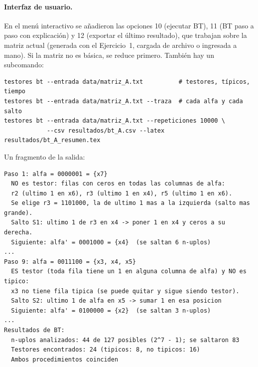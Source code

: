 \documentclass[11pt, a4paper]{article}
\theoremstyle{definition}
\theoremstyle{plain}
\begin{document}
\paragraph{Interfaz de usuario.} En el menú interactivo se añadieron las opciones
10 (ejecutar BT), 11 (BT paso a paso con explicación) y 12 (exportar el último
resultado), que trabajan sobre la matriz actual (generada con el Ejercicio~1,
cargada de archivo o ingresada a mano). Si la matriz no es básica, se reduce
primero. También hay un subcomando:
\begin{Verbatim}[fontsize=\small, frame=single]
testores bt --entrada data/matriz_A.txt          # testores, típicos, tiempo
testores bt --entrada data/matriz_A.txt --traza  # cada alfa y cada salto
testores bt --entrada data/matriz_A.txt --repeticiones 10000 \
            --csv resultados/bt_A.csv --latex resultados/bt_A_resumen.tex
\end{Verbatim}
Un fragmento de la salida:
\begin{Verbatim}[fontsize=\small, frame=single]
Paso 1: alfa = 0000001 = {x7}
  NO es testor: filas con ceros en todas las columnas de alfa:
  r2 (ultimo 1 en x6), r3 (ultimo 1 en x4), r5 (ultimo 1 en x6).
  Se elige r3 = 1101000, la de ultimo 1 mas a la izquierda (salto mas grande).
  Salto S1: ultimo 1 de r3 en x4 -> poner 1 en x4 y ceros a su derecha.
  Siguiente: alfa' = 0001000 = {x4}  (se saltan 6 n-uplos)
...
Paso 9: alfa = 0011100 = {x3, x4, x5}
  ES testor (toda fila tiene un 1 en alguna columna de alfa) y NO es tipico:
  x3 no tiene fila tipica (se puede quitar y sigue siendo testor).
  Salto S2: ultimo 1 de alfa en x5 -> sumar 1 en esa posicion
  Siguiente: alfa' = 0100000 = {x2}  (se saltan 3 n-uplos)
...
Resultados de BT:
  n-uplos analizados: 44 de 127 posibles (2^7 - 1); se saltaron 83
  Testores encontrados: 24 (tipicos: 8, no tipicos: 16)
  Ambos procedimientos coinciden
\end{Verbatim}
\end{document}
